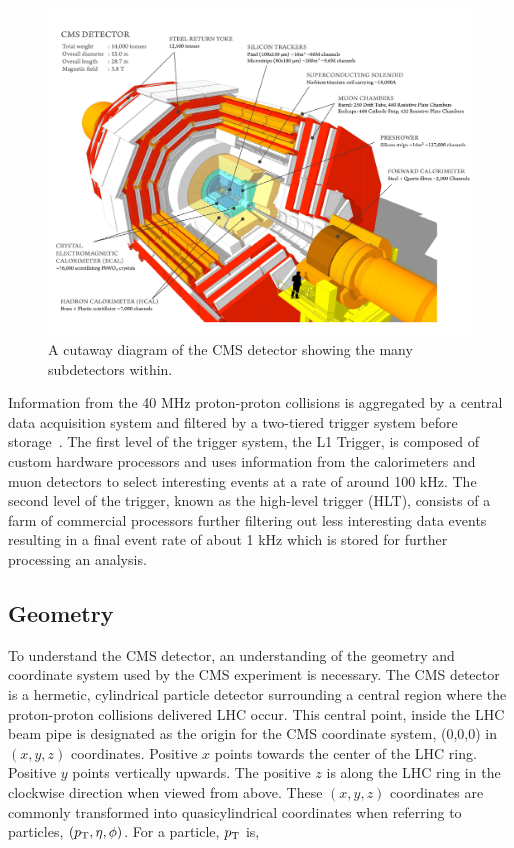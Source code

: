 \begin{figure}[htbp]
\centering
     \includegraphics[width=1.0\textwidth]{cms_and_lhc/plots/cms_detector.pdf}
     \caption{
A cutaway diagram of the CMS detector showing the many subdetectors within.
     }
     \label{fig:cms_detector}
\end{figure}

Information from the 40 MHz proton-proton collisions is aggregated by a central data acquisition system
and filtered by a two-tiered trigger system before storage~\cite{Khachatryan:2016bia}. 
The first level of the trigger system, the L1 Trigger, is composed of custom hardware processors and uses information 
from the calorimeters and muon detectors to select interesting events at a rate of around 100 kHz. The second level of
the trigger, known as the high-level trigger (HLT), consists of a farm of commercial processors further
filtering out less interesting data events resulting in a final event rate of about 1 kHz which is stored
for further processing an analysis.



\subsection{Geometry}
To understand the CMS detector, an understanding of the geometry and coordinate system used by the 
CMS experiment is necessary. The CMS detector is a hermetic, cylindrical particle detector surrounding
a central region where the proton-proton collisions delivered LHC occur. This central
point, inside the LHC beam pipe is designated as the origin for the CMS coordinate system, (0,0,0) in
$(x, y, z)$ coordinates. Positive $x$ points towards the center of the LHC ring.
Positive $y$ points vertically upwards. The positive $z$ is along the LHC ring in the
clockwise direction when viewed from above. These $(x, y, z)$ coordinates are commonly transformed
into quasicylindrical coordinates when referring to particles, $(p_\mathrm{T}, \eta, \phi)$. For a particle,
$p_\mathrm{T}$ is,

